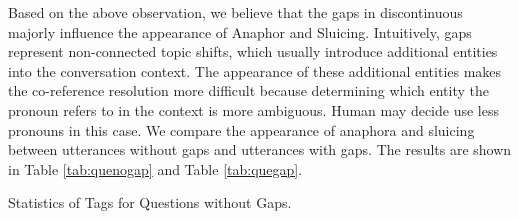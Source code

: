 \documentclass[bsc,frontabs,twoside,singlespacing,parskip,deptreport]{infthesis}     %
\begin{document}
Based on the above observation, we believe that the gaps in discontinuous majorly influence the appearance of Anaphor and Sluicing. Intuitively, gaps represent non-connected topic shifts, which usually introduce additional entities into the conversation context. The appearance of these additional entities makes the co-reference resolution more difficult because determining which entity the pronoun refers to in the context is more ambiguous. Human may decide use less pronouns in this case. We compare the appearance of anaphora and sluicing between utterances without gaps and utterances with gaps. The results are shown in Table \ref{tab:quenogap} and Table \ref{tab:quegap}.


\begin{minipage}{\textwidth}


        \begin{minipage}[t]{0.45\textwidth}
            \centering
            \makeatletter{}\makeatother


\caption{Statistics of Tags for Questions without Gaps.}
\label{tab:quenogap}




\end{minipage}
\end{minipage}
\end{document}
